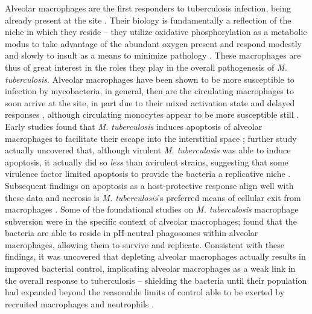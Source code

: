 Alveolar macrophages are the first responders to tuberculosis infection, being already present at the site \citep{Flynn2001}. Their biology is fundamentally a reflection of the niche in which they reside -- they utilize oxidative phosphorylation as a metabolic modus to take advantage of the abundant oxygen present and respond modestly and slowly to insult as a means to minimize pathology \citep{Joshi2018}. These macrophages are thus of great interest in the roles they play in the overall pathogenesis of \textit{M. tuberculosis}. Alveolar macrophages have been shown to be more susceptible to infection by mycobacteria, in general, then are the circulating macrophages to soon arrive at the site, in part due to their mixed activation state and delayed responses \citep{Kahnert2006, Madden2022}, although circulating monocytes appear to be more susceptible still \citep{Cambier2014b, Cambier2017}. Early studies found that \textit{M. tuberculosis} induces apoptosis of alveolar macrophages to facilitate their escape into the interstitial space \citep{Keane1997}; further study actually uncovered that, although virulent \textit{M. tuberculosis} was able to induce apoptosis, it actually did so \textit{less} than avirulent strains, suggesting that some virulence factor limited apoptosis to provide the bacteria a replicative niche \citep{Keane2000, Cohen2018}. Subsequent findings on apoptosis as a host\hyp{}protective response align well with these data and necrosis is \textit{M. tuberculosis}'s preferred means of cellular exit from macrophages \citep{Behar2011}. Some of the foundational studies on \textit{M. tuberculosis} macrophage subversion were in the specific context of alveolar macrophages; \citet{Mwandumba2004} found that the bacteria are able to reside in pH\hyp{}neutral phagosomes within alveolar macrophages, allowing them to survive and replicate. Consistent with these findings, it was uncovered that depleting alveolar macrophages actually results in improved bacterial control, implicating alveolar macrophages as a weak link in the overall response to tuberculosis -- shielding the bacteria until their population had expanded beyond the reasonable limits of control able to be exerted by recruited macrophages and neutrophils \citep{Leemans2001}. 

